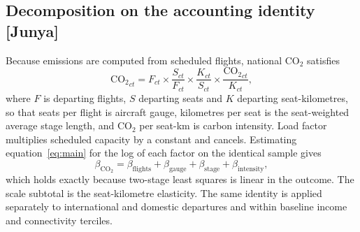 \documentclass[12pt]{article}
\begin{document}
\subsection*{Decomposition on the accounting identity [Junya]}
Because emissions are computed from scheduled flights, national CO$_2$
satisfies
\begin{equation}
\mathrm{CO_2}_{ct} = F_{ct} \times \frac{S_{ct}}{F_{ct}} \times
\frac{K_{ct}}{S_{ct}} \times \frac{\mathrm{CO_2}_{ct}}{K_{ct}},
\label{eq:identity}
\end{equation}
where $F$ is departing flights, $S$ departing seats and $K$ departing
seat-kilometres, so that seats per flight is aircraft gauge, kilometres per
seat is the seat-weighted average stage length, and CO$_2$ per seat-km is
carbon intensity. Load factor multiplies scheduled capacity by a constant
and cancels. Estimating equation~\ref{eq:main} for the log of each factor
on the identical sample gives
\begin{equation}
\beta_{\mathrm{CO_2}} = \beta_{\mathrm{flights}} + \beta_{\mathrm{gauge}} +
\beta_{\mathrm{stage}} + \beta_{\mathrm{intensity}},
\label{eq:decomp}
\end{equation}
which holds exactly because two-stage least squares is linear in the
outcome. The scale subtotal is the seat-kilometre elasticity. The same
identity is applied separately to international and domestic departures
and within baseline income and connectivity terciles.
\end{document}
